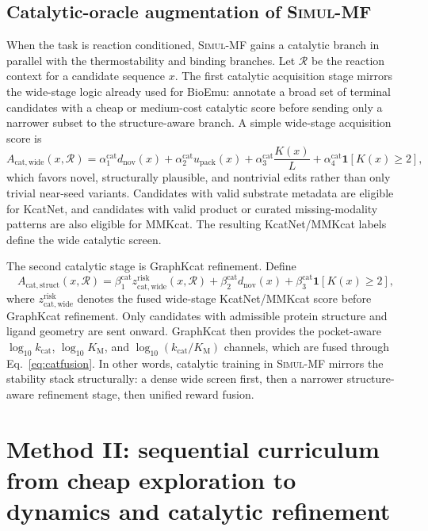 \documentclass[11pt]{article}
\newcommand{\packunc}{\ensuremath{u_{\mathrm{pack}}}}
\newcommand{\logkcat}{\ensuremath{\log_{10} k_{\mathrm{cat}}}}
\newcommand{\logKm}{\ensuremath{\log_{10} K_{\mathrm M}}}
\newcommand{\logeff}{\ensuremath{\log_{10}(k_{\mathrm{cat}}/K_{\mathrm M})}}
\newcommand{\methodI}{\textsc{Simul-MF}}
\begin{document}
	\subsection{Catalytic-oracle augmentation of \methodI{}}
	
	When the task is reaction conditioned, \methodI{} gains a catalytic branch in parallel with the thermostability and binding branches. Let $\mathcal{R}$ be the reaction context for a candidate sequence $x$. The first catalytic acquisition stage mirrors the wide-stage logic already used for BioEmu: annotate a broad set of terminal candidates with a cheap or medium-cost catalytic score before sending only a narrower subset to the structure-aware branch. A simple wide-stage acquisition score is
	\begin{equation}
		A_{\mathrm{cat,wide}}(x,\mathcal{R})=
		\alpha^{\mathrm{cat}}_1 d_{\mathrm{nov}}(x)+
		\alpha^{\mathrm{cat}}_2 \packunc(x)+
		\alpha^{\mathrm{cat}}_3 \frac{K(x)}{L}+
		\alpha^{\mathrm{cat}}_4 \mathbf{1}[K(x)\ge 2],
	\end{equation}
	which favors novel, structurally plausible, and nontrivial edits rather than only trivial near-seed variants. Candidates with valid substrate metadata are eligible for KcatNet, and candidates with valid product or curated missing-modality patterns are also eligible for MMKcat. The resulting KcatNet/MMKcat labels define the wide catalytic screen.
	
	The second catalytic stage is GraphKcat refinement. Define
	\begin{equation}
		A_{\mathrm{cat,struct}}(x,\mathcal{R})=
		\beta^{\mathrm{cat}}_1 z_{\mathrm{cat,wide}}^{\mathrm{risk}}(x,\mathcal{R})+
		\beta^{\mathrm{cat}}_2 d_{\mathrm{nov}}(x)+
		\beta^{\mathrm{cat}}_3 \mathbf{1}[K(x)\ge 2],
	\end{equation}
	where $z_{\mathrm{cat,wide}}^{\mathrm{risk}}$ denotes the fused wide-stage KcatNet/MMKcat score before GraphKcat refinement. Only candidates with admissible protein structure and ligand geometry are sent onward. GraphKcat then provides the pocket-aware $\logkcat$, $\logKm$, and $\logeff$ channels, which are fused through Eq.~\eqref{eq:catfusion}. In other words, catalytic training in \methodI{} mirrors the stability stack structurally: a dense wide screen first, then a narrower structure-aware refinement stage, then unified reward fusion.
	
	\section{Method II: sequential curriculum from cheap exploration to dynamics and catalytic refinement}
	\label{sec:method2}
	
\end{document}
